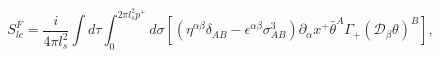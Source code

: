 \begin{equation}   
S^F_{lc} = \frac{i}{4 \pi l_s^2} \int d \tau \int_{0}^{2 \pi l_s^2 p^+} d \sigma
\left[ 
   \left( \eta^{\alpha \beta} \delta_{AB} - \epsilon^{\alpha \beta} \sigma^3_{AB} \right)
   \partial_\alpha x^+ \bar{\theta}^A \Gamma_+ \left( \mathcal{D}_\beta \theta \right)^B 
\right],
\end{equation}


